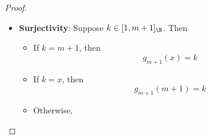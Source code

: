 \begin{proof}
\begin{enumerate}[label=\textbf{(\Alph*)}]
\begin{itemize}
\begin{itemize}
\begin{itemize}
\begin{itemize}
\[\begin{array}{c}
                                              g_{m + 1}(y_{1}) = m + 1 \\
                                              \Downarrow               \\
                                              g_{m + 1}(y_{2}) = m + 1 \\
                                              \Downarrow               \\
                                              y_{2} = x
                                            \end{array}
                                          \]
                                    \item Otherwise,
                                          \[
                                            \begin{array}{c}
                                              g_{m + 1}(y_{1}) = y_{1}                                         \\
                                              \Downarrow                                                       \\
                                              g_{m + 1}(y_{2}) = y_{1}                                         \\
                                              \by{\ensuremath{y_{1} \neq m + 1 \land y_{1} \neq x}} \Downarrow \\
                                              g_{m + 1}(y_{2}) = y_{2} = y_{1}
                                            \end{array}
                                          \]
                                  \end{itemize}
                            \item \textbf{Surjectivity}: Suppose $k \in [1, m + 1]_{\N}$. Then
                                  \begin{itemize}
                                    \item If $k = m + 1$, then
                                          \[
                                            g_{m + 1}(x) = k
                                          \]
                                    \item If $k = x$, then
                                          \[
                                            g_{m + 1}(m + 1) = k
                                          \]
                                    \item Otherwise,

\end{itemize}
\end{itemize}
\end{itemize}
\end{itemize}
\end{enumerate}
\end{proof}

